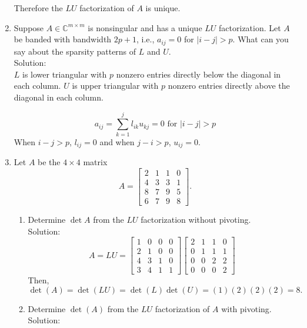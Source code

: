 \documentclass[12pt]{article}
\numberwithin{equation}{section}
\newcommand{\abs}[1]{\left\vert#1\right\vert}
\begin{document}
\begin{enumerate}
    Therefore the $LU$ factorization of $A$ is unique.

\item Suppose $A\in\mathbb{C}^{m\times m}$ is nonsingular and has a unique $LU$ factorization. Let $A$ be banded with bandwidth $2p+1$, i.e., $a_{ij}=0$ for $\abs{i-j}>p.$ What can you say about the sparsity patterns of $L$ and $U$.\\
    
    Solution:\\
    
    $L$ is lower triangular with $p$ nonzero entries directly below the diagonal in each column. $U$ is upper triangular with $p$ nonzero entries directly above the diagonal in each column.
    
    $$a_{ij}=\sum_{k=1}^j l_{ik}u_{kj}=0 \text{ for } \abs{i-j}>p$$
    When $i-j>p$, $l_{ij}=0$ and when $j-i>p$, $u_{ij}=0$.
    
\item Let $A$ be the $4 \times 4$ matrix 
$$A=\left[\begin{array}{cccc} 2&1&1&0\\4&3&3&1\\8&7&9&5\\6&7&9&8\end{array}\right].$$
    \begin{enumerate}
    \item Determine $\det A$ from the $LU$ factorization without pivoting.\\
    
    Solution:\\
    
    $$A=LU=\left[\begin{array}{cccc}1&0&0&0\\2&1&0&0\\4&3&1&0\\3&4&1&1\end{array}\right]\left[\begin{array}{cccc}2&1&1&0\\0&1&1&1\\0&0&2&2\\0&0&0&2\end{array}\right]$$
    Then,
    $$\det(A)=\det(LU)=\det(L)\det(U)=(1)(2)(2)(2)=8.$$
    
    \item Determine $\det(A)$ from the $LU$ factorization of $A$ with pivoting.\\
    
    Solution:\\
    

\end{enumerate}
\end{enumerate}
\end{document}
